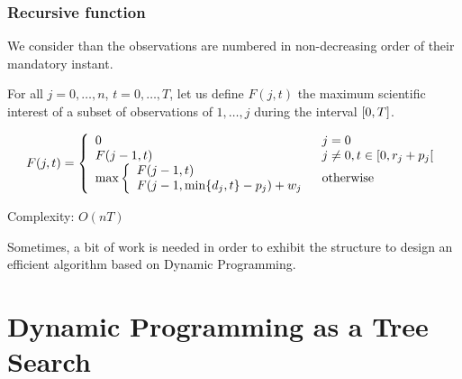 \documentclass{beamer}
\begin{document}
\begin{frame}
  \frametitle{Recursive function}
  \small

  We consider than the observations are numbered in non-decreasing order of their mandatory instant.

  \bigskip

  \pause
  For all $j = 0, \dots, n$, $t = 0, \dots, T$, let us define \alert{$F(j, t)$} the maximum scientific interest of a subset of observations of $1, \dots, j$ during the interval $\interval[]{0}{T}$.

  \pause
  \begin{displaymath}
    F(j, t) = 
    \left\{
      \begin{array}{ll}
        0 & j = 0 \\
        F(j - 1, t) & j \neq 0, t \in \interval[open right]{0}{r_j + p_j} \\
          \max \left\{ 
            \begin{array}{l}
              F(j - 1, t)	 \\
              F(j - 1, \min\{d_j, t\} - p_j) + w_j
            \end{array}
            \right. & \text{otherwise} \\
      \end{array}
    \right.
  \end{displaymath}

  \pause
  Complexity: $O(nT)$

  \bigskip

  \pause
  Sometimes, a bit of work is needed in order to exhibit the structure to design an efficient algorithm based on Dynamic Programming.
\end{frame}

\section{Dynamic Programming as a Tree Search}
\end{document}

